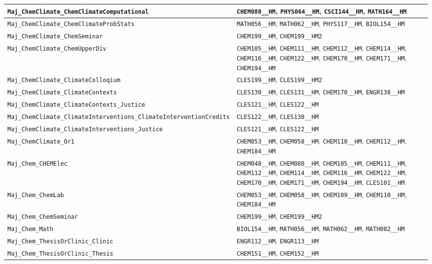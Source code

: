 \begin{longtable}{|p{4.4in}|p{4.4in}|}
    \verb|Maj_ChemClimate_ChemClimateComputational| & \verb|CHEM080__HM|, \verb|PHYS064__HM|, \verb|CSCI144__HM|, \verb|MATH164__HM|\\\hline
    \verb|Maj_ChemClimate_ChemClimateProbStats| & \verb|MATH056__HM|, \verb|MATH062__HM|, \verb|PHYS117__HM|, \verb|BIOL154__HM|\\\hline
    \verb|Maj_ChemClimate_ChemSeminar| & \verb|CHEM199__HM|, \verb|CHEM199__HM2|\\\hline
    \verb|Maj_ChemClimate_ChemUpperDiv| & \verb|CHEM105__HM|, \verb|CHEM111__HM|, \verb|CHEM112__HM|, \verb|CHEM114__HM|, \verb|CHEM116__HM|, \verb|CHEM122__HM|, \verb|CHEM170__HM|, \verb|CHEM171__HM|, \verb|CHEM194__HM|\\\hline
    \verb|Maj_ChemClimate_ClimateColloqium| & \verb|CLES199__HM|, \verb|CLES199__HM2|\\\hline
    \verb|Maj_ChemClimate_ClimateContexts| & \verb|CLES130__HM|, \verb|CLES131__HM|, \verb|CHEM170__HM|, \verb|ENGR138__HM|\\\hline
    \verb|Maj_ChemClimate_ClimateContexts_Justice| & \verb|CLES121__HM|, \verb|CLES122__HM|\\\hline
    \verb|Maj_ChemClimate_ClimateInterventions_ClimateInterventionCredits| & \verb|CLES122__HM|, \verb|CLES130__HM|\\\hline
    \verb|Maj_ChemClimate_ClimateInterventions_Justice| & \verb|CLES121__HM|, \verb|CLES122__HM|\\\hline
    \verb|Maj_ChemClimate_Or1| & \verb|CHEM053__HM|, \verb|CHEM058__HM|, \verb|CHEM110__HM|, \verb|CHEM112__HM|, \verb|CHEM184__HM|\\\hline
    \verb|Maj_Chem_CHEMElec| & \verb|CHEM048__HM|, \verb|CHEM080__HM|, \verb|CHEM105__HM|, \verb|CHEM111__HM|, \verb|CHEM112__HM|, \verb|CHEM114__HM|, \verb|CHEM116__HM|, \verb|CHEM122__HM|, \verb|CHEM170__HM|, \verb|CHEM171__HM|, \verb|CHEM194__HM|, \verb|CLES101__HM|\\\hline
    \verb|Maj_Chem_ChemLab| & \verb|CHEM053__HM|, \verb|CHEM058__HM|, \verb|CHEM109__HM|, \verb|CHEM110__HM|, \verb|CHEM184__HM|\\\hline
    \verb|Maj_Chem_ChemSeminar| & \verb|CHEM199__HM|, \verb|CHEM199__HM2|\\\hline
    \verb|Maj_Chem_Math| & \verb|BIOL154__HM|, \verb|MATH056__HM|, \verb|MATH062__HM|, \verb|MATH082__HM|\\\hline
    \verb|Maj_Chem_ThesisOrClinic_Clinic| & \verb|ENGR112__HM|, \verb|ENGR113__HM|\\\hline
    \verb|Maj_Chem_ThesisOrClinic_Thesis| & \verb|CHEM151__HM|, \verb|CHEM152__HM|\\\hline

\end{longtable}
